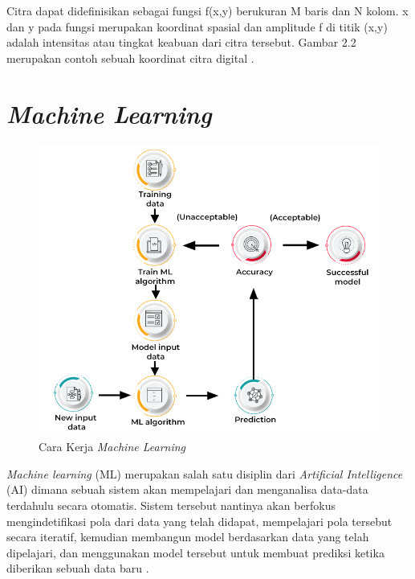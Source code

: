 Citra dapat didefinisikan sebagai fungsi f(x,y) berukuran M baris dan N kolom. x dan y pada fungsi merupakan koordinat 
spasial dan amplitude f di titik (x,y) adalah intensitas atau tingkat keabuan dari citra tersebut. Gambar 2.2 merupakan 
contoh sebuah koordinat citra digital \parencite{Putra2010}.

\section{\emph{Machine Learning}}
\label{sec:machinelearning}

\begin{figure}[ht]
  \centering
  \includegraphics[scale=0.5]{gambar/How Machine learning work.png}
  \caption{Cara Kerja \emph{Machine Learning}}
  \label{fig:carakerjamachinelearning}
\end{figure}

\emph{Machine learning} (ML) merupakan salah satu disiplin dari \emph{Artificial Intelligence} (AI) dimana sebuah sistem akan 
mempelajari dan menganalisa data-data terdahulu secara otomatis. Sistem tersebut nantinya akan berfokus mengindetifikasi 
pola dari data yang telah didapat, mempelajari pola tersebut secara iteratif, kemudian membangun model berdasarkan data 
yang telah dipelajari, dan menggunakan model tersebut untuk membuat prediksi ketika diberikan sebuah data baru \parencite{Russel2021}.

